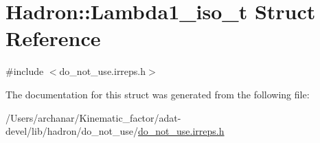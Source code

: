 \hypertarget{structHadron_1_1Lambda1__iso__t}{}\section{Hadron\+:\+:Lambda1\+\_\+iso\+\_\+t Struct Reference}
\label{structHadron_1_1Lambda1__iso__t}


{\ttfamily \#include $<$do\+\_\+not\+\_\+use.\+irreps.\+h$>$}



The documentation for this struct was generated from the following file\+:\begin{DoxyCompactItemize}
\item 
/\+Users/archanar/\+Kinematic\+\_\+factor/adat-\/devel/lib/hadron/do\+\_\+not\+\_\+use/\mbox{\hyperlink{adat-devel_2lib_2hadron_2do__not__use_2do__not__use_8irreps_8h}{do\+\_\+not\+\_\+use.\+irreps.\+h}}\end{DoxyCompactItemize}
